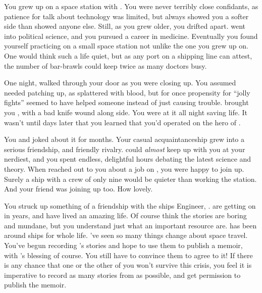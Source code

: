 \documentclass[char]{TMFHope}
\begin{document}
\name{\cMed{}}

You grew up on a space station with \cDip{\full}. You were never terribly close confidants, as \cDip{\their} patience for talk about technology was limited, but \cDip{\they} always showed you a softer side than \cDip{\they} showed anyone else. Still, as you grew older, you drifted apart. \cDip{} went into political science, and you pursued a career in medicine. Eventually you found yourself practicing on a small space station not unlike the one you grew up on. One would think such a life quiet, but as any port on a shipping line can attest, the number of bar-brawls could keep twice as many doctors busy.

One night, \cSci{\full} walked through your door as you were closing up. You assumed \cSci{\they} needed patching up, as \cSci{\they} \cSci{\were} splattered with blood, but for once \cSci{\their} propensity for ``jolly fights'' seemed to have helped someone instead of just causing trouble. \cSci{\They} brought you \cCap{\full}, with a bad knife wound along \cCap{\their} side. You were at it all night saving \cCap{\their} life. It wasn't until days later that you learned that you'd operated on the hero of \pBattle{}.

You and \cSci{} joked about it for months. Your casual acquaintanceship grew into a serious friendship, and friendly rivalry. \cSci{} could \emph{almost} keep up with you at your nerdiest, and you spent endless, delightful hours debating the latest science and theory. When \cCap{} reached out to you about a job on \pNew{}, you were happy to join up. Surely a ship with a crew of only nine would be quieter than working the station. And your friend \cSci{} was joining up too. How lovely.

You struck up something of a friendship with the ships Engineer, \cEng{}. \cEng{\They} are getting on in years, and have lived an amazing life. Of course \cEng{\they} think the stories are boring and mundane, but you understand just what an important resource \cEng{\they} are. \cEng{} has been around ships for \cEng{\their} whole life. \cEng{\They}'ve seen so many things change about space travel. You've begun recording \cEng{}'s stories and hope to use them to publish a memoir, with \cEng{}'s blessing of course. You still have to convince them to agree to it! If there is any chance that one or the other of you won't survive this crisis, you feel it is imperative to record as many stories from \cEng{\them} as possible, and get permission to publish the memoir.
\end{document}
